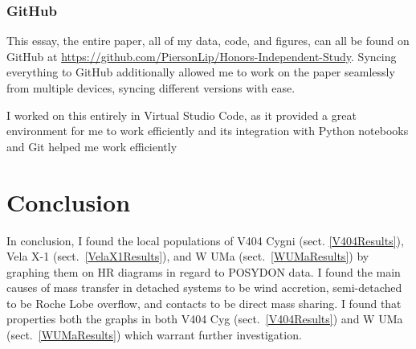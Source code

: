 \documentclass[12pt, a4paper]{article}
\begin{document}
        \subsubsection{GitHub} \label{GitHub}
            This essay, the entire paper, all of my data, code, and figures, can all be found on GitHub at \url{https://github.com/PiersonLip/Honors-Independent-Study}. Syncing everything to GitHub additionally allowed me to work on the paper seamlessly from multiple devices, syncing different versions with ease. 

            I worked on this entirely in Virtual Studio Code, as it provided a great environment for me to work efficiently and its integration with Python notebooks and Git helped me work efficiently

\section{Conclusion}
    In conclusion, I found the local populations of V404 Cygni (sect. \ref{V404Results}), Vela X-1 (sect.~\ref{VelaX1Results}), and W UMa (sect.~\ref{WUMaResults}) by graphing them on HR diagrams in regard to POSYDON data. I found the main causes of mass transfer in detached systems to be wind accretion, semi-detached to be Roche Lobe overflow, and contacts to be direct mass sharing. I found that properties both the graphs in both V404 Cyg (sect.~\ref{V404Results}) and W UMa (sect.~\ref{WUMaResults}) which warrant further investigation.


    \pagebreak
\printbibliography[
heading=bibintoc,
title={\centering Works Cited}
]
\end{document}
